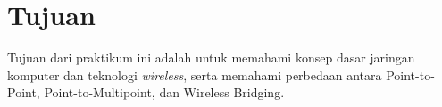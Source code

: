 \section*{Tujuan}

Tujuan dari praktikum ini adalah untuk memahami konsep dasar jaringan komputer dan teknologi \textit{wireless}, serta memahami perbedaan antara Point-to-Point, Point-to-Multipoint, dan Wireless Bridging.